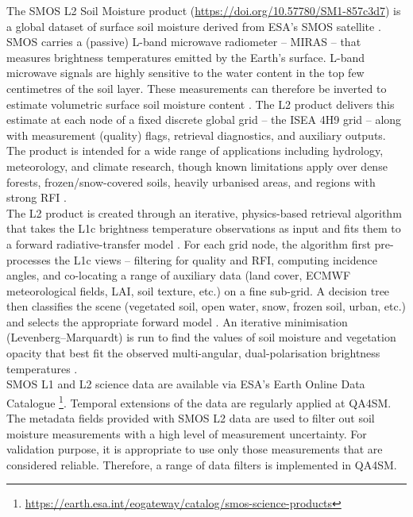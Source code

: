 \noindent The \ac{SMOS} \ac{L2} Soil Moisture product (\url{https://doi.org/10.57780/SM1-857c3d7}) is a global dataset of surface soil moisture derived from \ac{ESA}'s \ac{SMOS} satellite \citep{kerr2001}.
\ac{SMOS} carries a (passive) L-band microwave radiometer -- \ac{MIRAS} -- that measures brightness temperatures emitted by the Earth's surface.
L-band microwave signals are highly sensitive to the water content in the top few centimetres of the soil layer.
These measurements can therefore be inverted to estimate volumetric surface soil moisture content \citep{kerr1990,smosl2atbd}.
The \ac{L2} product delivers this estimate at each node of a fixed discrete global grid -- the \ac{ISEA} 4H9 grid \citep{talone2015} -- along with measurement (quality) flags, retrieval diagnostics, and auxiliary outputs.
The product is intended for a wide range of applications including hydrology, meteorology, and climate research, though known limitations apply over dense forests, frozen/snow-covered soils, heavily urbanised areas, and regions with strong \ac{RFI} \citep{smosl2atbd}.
\\[1em]
\noindent The \ac{L2} product is created through an iterative, physics-based retrieval algorithm that takes the \ac{L1c} brightness temperature observations as input and fits them to a forward radiative-transfer model \citep{kerr2012}.
For each grid node, the algorithm first pre-processes the \ac{L1c} views -- filtering for quality and \ac{RFI}, computing incidence angles, and co-locating a range of auxiliary data (land cover, \ac{ECMWF} meteorological fields, \ac{LAI}, soil texture, etc.) on a fine sub-grid.
A decision tree then classifies the scene (vegetated soil, open water, snow, frozen soil, urban, etc.) and selects the appropriate forward model \citep{kerr2012}.
An iterative minimisation (Levenberg--Marquardt) is run to find the values of soil moisture and vegetation opacity that best fit the observed multi-angular, dual-polarisation brightness temperatures \citep{smosl2atbd}.
\\[1em]
\noindent \ac{SMOS} \ac{L1} and \ac{L2} science data are available via \ac{ESA}'s Earth Online Data Catalogue \footnote{\url{https://earth.esa.int/eogateway/catalog/smos-science-products}}.
Temporal extensions of the data are regularly applied at \ac{QA4SM}.
\\[1em]
\noindent The metadata fields provided with \ac{SMOS} \ac{L2} data are used to filter out soil moisture measurements with a high level of measurement uncertainty.
For validation purpose, it is appropriate to use only those measurements that are considered reliable.
Therefore, a range of data filters is implemented in \ac{QA4SM}.

